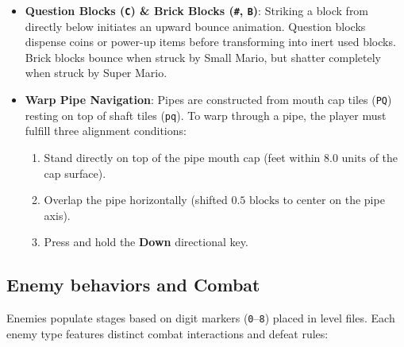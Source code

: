 \documentclass[12pt, a4paper]{article}
\begin{document}
\begin{itemize}
\item \textbf{Question Blocks (\texttt{C}) \& Brick Blocks (\texttt{\#}, \texttt{B})}: Striking a block from directly below initiates an upward bounce animation. Question blocks dispense coins or power-up items before transforming into inert used blocks. Brick blocks bounce when struck by Small Mario, but shatter completely when struck by Super Mario.
\item \textbf{Warp Pipe Navigation}: Pipes are constructed from mouth cap tiles (\texttt{PQ}) resting on top of shaft tiles (\texttt{pq}). To warp through a pipe, the player must fulfill three alignment conditions:
\begin{enumerate}
\item Stand directly on top of the pipe mouth cap (feet within $8.0\text{ units}$ of the cap surface).
\item Overlap the pipe horizontally (shifted $0.5\text{ blocks}$ to center on the pipe axis).
\item Press and hold the \textbf{Down} directional key.
\end{enumerate}
\end{itemize}

\subsection{Enemy behaviors and Combat}

Enemies populate stages based on digit markers (\texttt{0}--\texttt{8}) placed in level files. Each enemy type features distinct combat interactions and defeat rules:
\end{document}
